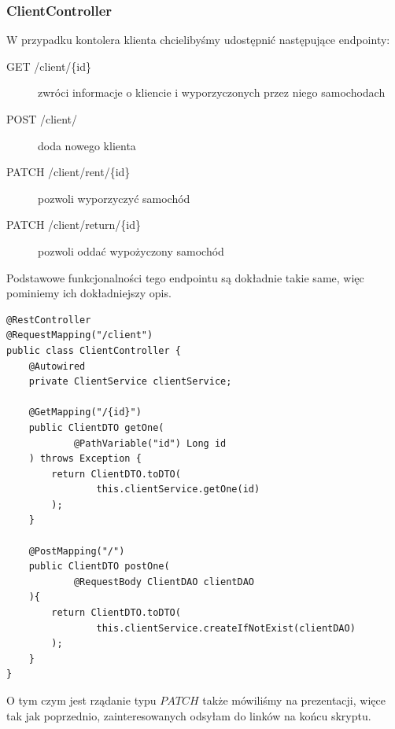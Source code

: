\documentclass{article}
\begin{document}
            \subsubsection{ClientController}
                W przypadku kontolera klienta chcielibyśmy udostępnić następujące endpointy:
                \begin{description}
                    \item[GET /client/\{id\}] zwróci informacje o kliencie i wyporzyczonych przez niego samochodach
                    \item[POST /client/] doda nowego klienta
                    \item[PATCH /client/rent/\{id\}] pozwoli wyporzyczyć samochód
                    \item[PATCH /client/return/\{id\}] pozwoli oddać wypożyczony samochód
                \end{description}
                Podstawowe funkcjonalności tego endpointu są dokładnie takie same, więc pominiemy ich dokładniejszy opis.
                \begin{verbatim}
@RestController
@RequestMapping("/client")
public class ClientController {
    @Autowired
    private ClientService clientService;

    @GetMapping("/{id}")
    public ClientDTO getOne(
            @PathVariable("id") Long id
    ) throws Exception {
        return ClientDTO.toDTO(
                this.clientService.getOne(id)
        );
    }

    @PostMapping("/")
    public ClientDTO postOne(
            @RequestBody ClientDAO clientDAO
    ){
        return ClientDTO.toDTO(
                this.clientService.createIfNotExist(clientDAO)
        );
    }
}
                \end{verbatim}
                O tym czym jest rządanie typu $PATCH$ także mówiliśmy na prezentacji, więce tak jak poprzednio, zainteresowanych odsyłam do linków na końcu skryptu.
                
\end{document}
